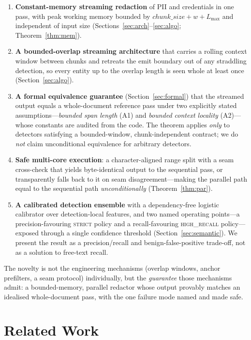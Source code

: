 \documentclass[runningheads]{llncs}
\newcommand{\Lmax}{L_{\max}}
\begin{document}
\begin{enumerate}
\item \textbf{Constant-memory streaming redaction} of PII and credentials in one
pass, with peak working memory bounded by
$\mathit{chunk\_size} + w + \Lmax$ and independent of input size
(Sections~\ref{sec:arch}--\ref{sec:algo}; Theorem~\ref{thm:mem}).
\item \textbf{A bounded-overlap streaming architecture} that carries a rolling
context window between chunks and retreats the emit boundary out of any
straddling detection, so every entity up to the overlap length is seen whole at
least once (Section~\ref{sec:algo}).
\item \textbf{A formal equivalence guarantee} (Section~\ref{sec:formal}) that the
streamed output equals a whole-document reference pass under two explicitly
stated assumptions---\emph{bounded span length} (A1) and \emph{bounded context
locality} (A2)---whose constants are audited from the code. The theorem applies
\emph{only} to detectors satisfying a bounded-window, chunk-independent
contract; we do \emph{not} claim unconditional equivalence for arbitrary
detectors.
\item \textbf{Safe multi-core execution}: a character-aligned range split with a
seam cross-check that yields byte-identical output to the sequential pass, or
transparently falls back to it on seam disagreement---making the parallel path
equal to the sequential path \emph{unconditionally} (Theorem~\ref{thm:par}).
\item \textbf{A calibrated detection ensemble} with a dependency-free logistic
calibrator over detection-local features, and two named operating points---a
precision-favouring \textsc{strict} policy and a recall-favouring
\textsc{high\_recall} policy---exposed through a single confidence threshold
(Section~\ref{sec:semantic}). We present the result as a precision/recall and
benign-false-positive trade-off, not as a solution to free-text recall.
\end{enumerate}

The novelty is not the engineering mechanisms (overlap windows, anchor
prefilters, a seam protocol) individually, but the \emph{guarantee} those
mechanisms admit: a bounded-memory, parallel redactor whose output provably
matches an idealised whole-document pass, with the one failure mode named and
made safe.

\section{Related Work}
\label{sec:related}
\end{document}
